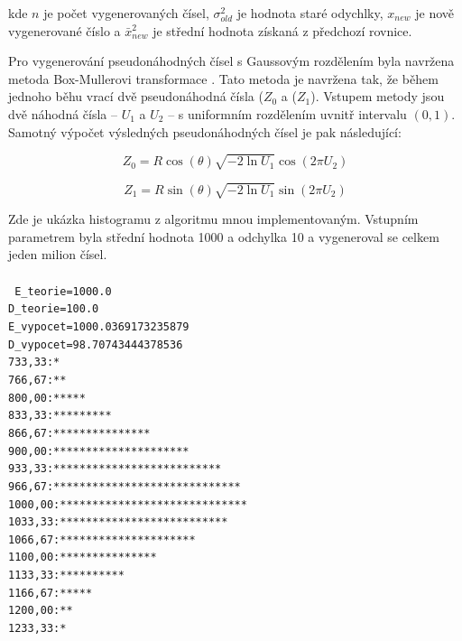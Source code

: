 \documentclass{article}
\begin{document}
kde \( n \) je počet vygenerovaných čísel, \( \sigma^{2}_{old} \) je hodnota staré odychlky,  \( x_{new} \) je nově vygenerované číslo a \( \bar{x}^{2}_{new}  \) je střední hodnota získaná z předchozí rovnice.


Pro vygenerování pseudonáhodných čísel s Gaussovým rozdělením byla navržena metoda Box-Mullerovi transformace \cite{box1958note}.
Tato metoda je navržena tak, že během jednoho běhu vrací dvě pseudonáhodná čísla (\( Z_0 \) a (\( Z_1 \)). 
Vstupem metody jsou dvě náhodná čísla -- \( U_1 \) a \( U_2 \) -- s uniformním rozdělením uvnitř intervalu \( (0,1) \).
Samotný výpočet výsledných pseudonáhodných čísel je pak následující:


\begin{equation} 
Z_0 = R\cos{(\theta)} \sqrt{-2\ln{U_1}}\cos{(2\pi U_2)}
\end{equation}

\begin{equation} 
Z_1 = R\sin{(\theta)} \sqrt{-2\ln{U_1}}\sin{(2\pi U_2)}
\end{equation}

Zde je ukázka histogramu z algoritmu mnou implementovaným. Vstupním parametrem byla střední hodnota 1000 a odchylka 10 a vygeneroval se celkem jeden milion čísel.\\\\
\texttt
{
E\_teorie=1000.0\\
D\_teorie=100.0\\
E\_vypocet=1000.0369173235879\\
D\_vypocet=98.70743444378536\\
733,33:*\\
766,67:**\\
800,00:*****\\
833,33:*********\\
866,67:***************\\
900,00:*********************\\
933,33:**************************\\
966,67:*****************************\\
1000,00:*****************************\\
1033,33:**************************\\
1066,67:*********************\\
1100,00:***************\\
1133,33:**********\\
1166,67:*****\\
1200,00:**\\
1233,33:*\\
}
\end{document}
